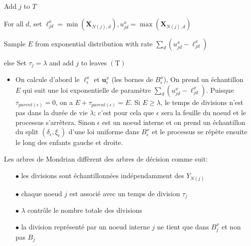 {\fontsize{4}{4}\selectfont
\begin{algorithm}[h]
\caption{\textsc{$\operatorname{SampleMondrianBlock}(j,\mathcal{D}_{N{_{(j)}}},\lambda)$}}
%
Add $j$ to $T$

For all $d$, set $\ell_{j d}^{x}=\min (\boldsymbol{X}_{N(j), d}), u_{j d}^{x}=\max (\boldsymbol{X}_{N(j), d})$

Sample $E$ from exponential distribution with rate $\sum_{d}(u_{j d}^{x}-\ell_{j d}^{x})$


else Set $\tau_{j}=\lambda$ and add $j$ to leaves $(\mathrm{T})$
\end{algorithm}
}

\begin{itemize}
    \item On calcule d'abord le $\ell_{\epsilon}^{x}$ et $\mathbf{u}_{\epsilon}^{x}$ (les bornes de $B_\epsilon^x$), On prend un échantillon $E$ qui suit une loi exponentielle de paramètre $\sum_{d}\left(u_{j d}^{x}-\ell_{j d}^{x}\right)$. Puisque $\tau_{parent(\epsilon)}=0$, on a $E+\tau_{parent(\epsilon)}=E$. Si $E\ge \lambda$, le temps de divisions n'est pas dans la durée de vie $\lambda$; c'est pour cela que $\epsilon$ sera la feuille du noeud et le processus s'arrêtera. Sinon $\epsilon$ est un noeud interne et on prend un échantillon du split $(\delta_\epsilon,\xi_\epsilon)$ d'une loi uniforme dans $B_\epsilon^x$ et le processus se répète ensuite le long des enfants gauche et droite.
\end{itemize}

Les arbres de Mondrian diffèrent des arbres de décision comme suit:
\begin{itemize}
    \item[$\bullet$] les divisions sont échantillonnées indépendamment des $Y_{N(j)}$
    \item[$\bullet$] chaque noeud $j$ est associé avec un temps de division $\tau_j$
    \item[$\bullet$] $\lambda$ contrôle le nombre totale des divisions
    \item[$\bullet$] la division représenté par un noeud interne $j$ ne tient que dans $B_j^x$ et non pas $B_j$
\end{itemize}

